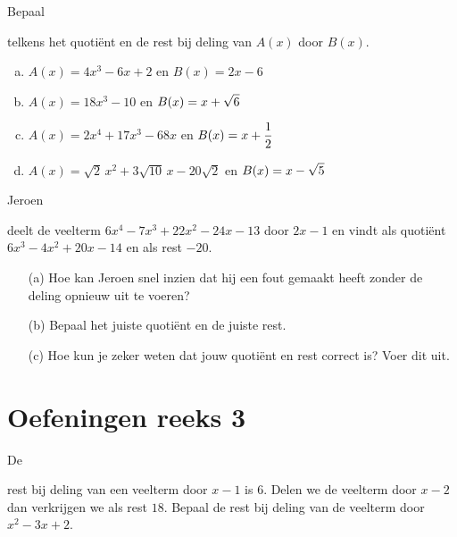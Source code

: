 \documentclass{ximera}
\begin{document}
\begin{Oefening}\setcounter{enumi}{14}  
\hypertarget{oef3.14}{Bepaal} telkens het quoti\"ent en de rest bij deling van $A(x)$ door $B(x)$.
\begin{enumerate}[(a)]
\item
$A(x) = 4x^3-6x+2$ \quad en \quad $B(x) = 2x-6$
\item
$A(x) = 18x^3-10$ \quad en \quad $\displaystyle B(x) = x + \sqrt{6}$
\item 
$A(x) = 2x^4 + 17x^3 - 68x$ \quad en \quad $\displaystyle B(x) = x+\frac{1}{2}$
\item 
$A(x) = \sqrt{2}\,x^2 + 3\sqrt{10}\,x - 20\sqrt{2}$ \quad en \quad $\displaystyle B(x) = x - \sqrt{5}$
\end{enumerate}
\end{Oefening}

\begin{Oefening}\setcounter{enumi}{15}  
\hypertarget{oef3.15}{Jeroen} deelt de veelterm $6x^4-7x^3+22x^2-24x-13$ door $2x-1$ en vindt als quoti\"ent $6x^3-4x^2+20x-14$ en als rest $-20$. 
\begin{enumerate}
\item[(a)]
Hoe kan Jeroen snel inzien dat hij een fout gemaakt heeft zonder de deling opnieuw uit te voeren? 
\item[(b)]
Bepaal het juiste quoti\"ent en de juiste rest.
\item[(c)]
Hoe kun je zeker weten dat jouw quoti\"ent en rest correct is? Voer dit uit.
\end{enumerate}
\end{Oefening}

\section*{Oefeningen reeks 3}

\begin{Oefening}\setcounter{enumi}{16}   
\hypertarget{oef3.16}{De} rest bij deling van een veelterm door $x-1$ is $6$. Delen we de veelterm door $x-2$ dan verkrijgen we als rest $18$. Bepaal de rest bij deling van de veelterm door $x^2-3x+2$. %
\end{Oefening}
\end{document}
